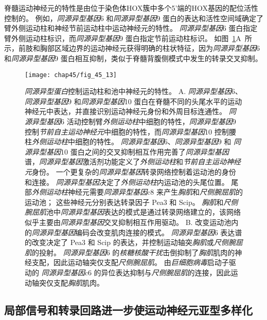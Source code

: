 脊髓运动神经元的特性是由位于染色体HOX簇中多个5'端的HOX基因的配位活性控制的。
例如，\textit{同源异型基因}6 和\textit{同源异型基因}9 蛋白的表达和活性空间域确定了臂外侧运动柱和神经节前运动柱中运动神经元的特性。
\textit{同源异型基因}6 蛋白指定臂外侧运动柱标识，而\textit{同源异型基因}9 蛋白指定节前运动柱标识。
如图~\ref{fig:45_13}A~所示，前肢和胸部区域边界的运动神经元获得明确的柱状特征，因为\textit{同源异型基因}6 和\textit{同源异型基因}9 蛋白相互抑制，类似于脊髓背腹侧模式中发生的转录交叉抑制。


\begin{figure}[htbp]
	\centering
	\texttt{[image: chap45/fig\_45\_13]}
	\caption{\textit{同源异型蛋白}控制运动柱和池中神经元的特性\cite{dasen2005hox}。
		A. \textit{同源异型基因}6、\textit{同源异型基因}9 和\textit{同源异型基因}10 蛋白在脊髓不同的头尾水平的运动神经元中表达，并直接识别运动神经元身份和外周目标连通性。
		\textit{同源异型基因}6 活动控制臂\textit{外侧运动柱}中细胞的特性，\textit{同源异型基因}9 控制\textit{节前自主运动神经元}中细胞的特性，而\textit{同源异型基因}10 控制腰柱\textit{外侧运动柱}中细胞的特性。
		\textit{同源异型基因}6、\textit{同源异型基因}9 和 \textit{同源异型基因}10 蛋白之间的交叉抑制相互作用完善了\textit{同源异型基因}谱，\textit{同源异型基因}激活剂功能定义了\textit{外侧运动柱}和\textit{节前自主运动神经元}身份。
		一个更复杂的\textit{同源异型基因}转录网络控制着运动池的身份和连接。
		\textit{同源异型基因}决定了\textit{外侧运动柱}内运动池的头尾位置。
		尾部\textit{外侧运动柱}神经元需要\textit{同源异型基因}c8 来产生\textit{胸肌}和\textit{尺侧腕屈肌}的运动池；
		这些神经元分别表达转录因子 Pea3 和 Scip。
		\textit{胸肌}和\textit{尺侧腕屈肌}池中\textit{同源异型基因}表达的模式是通过转录网络建立的，该网络似乎主要由\textit{同源异型基因}交叉抑制相互作用驱动。
		B. 改变运动池内的\textit{同源异型基因}编码会改变肌肉连接的模式。
		\textit{同源异型基因}6 表达谱的改变决定了 Pea3 和 Scip 的表达，并控制运动轴突\textit{胸肌}或\textit{尺侧腕屈肌}的投射。
		\textit{同源异型基因}6 的\textit{核糖核酸干扰}击倒抑制了\textit{胸肌}肌肉的神经支配，因此运动轴突仅支配\textit{尺侧腕屈肌}。
		由\textit{巨细胞病毒}启动子驱动的 \textit{同源异型基因}c6 的异位表达抑制与\textit{尺侧腕屈肌}的连接，因此运动轴突仅支配\textit{胸肌}肌肉。}
	\label{fig:45_13}
\end{figure}



\subsection{局部信号和转录回路进一步使运动神经元亚型多样化}

